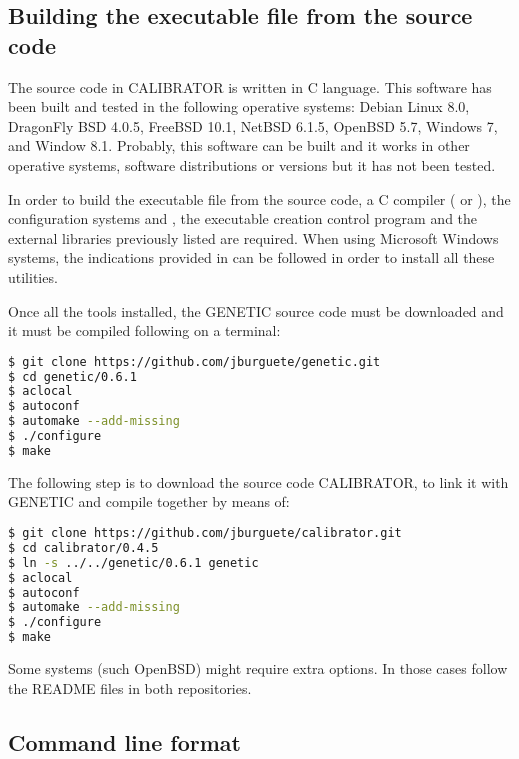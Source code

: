 \documentclass[review,authoryear]{elsarticle}
\begin{document}
\subsection{Building the executable file from the source code}

The source code in CALIBRATOR is written in C language. This software has
been built and tested in the following operative systems:
Debian Linux 8.0,
DragonFly BSD 4.0.5,
FreeBSD 10.1,
NetBSD 6.1.5,
OpenBSD 5.7,
Windows 7\footnotemark[1],
and Window 8.1\footnotemark[1].
Probably, this software can be built and it works in other operative systems,
software distributions or versions but it has not been tested.

In order to build the executable file from the source code, a C compiler (\citet{gcc} or \citet{clang}), the configuration systems \citet{autoconf} and \citet{automake}, the executable creation control program \citet{gnumake} and the external libraries previously listed are required. When using Microsoft Windows systems, the indications provided in \citet{install-unix} can be followed in order to install all these utilities.

Once all the tools installed, the GENETIC source code must be downloaded and it must be compiled following on a terminal:
\begin{lstlisting}[language=bash,basicstyle=\scriptsize]
$ git clone https://github.com/jburguete/genetic.git
$ cd genetic/0.6.1
$ aclocal
$ autoconf
$ automake --add-missing
$ ./configure
$ make
\end{lstlisting}

The following step is to download the source code CALIBRATOR, to link it with GENETIC and compile together by means of:
\begin{lstlisting}[language=bash,basicstyle=\scriptsize]
$ git clone https://github.com/jburguete/calibrator.git
$ cd calibrator/0.4.5
$ ln -s ../../genetic/0.6.1 genetic
$ aclocal
$ autoconf
$ automake --add-missing
$ ./configure
$ make
\end{lstlisting}

Some systems (such OpenBSD) might require extra options. In those cases follow the README files in both repositories.

\subsection{Command line format}
\end{document}
